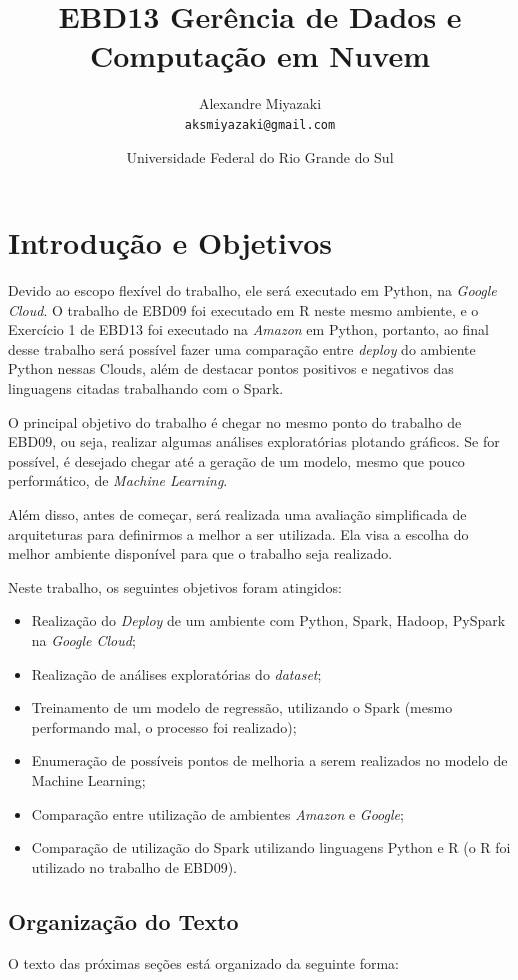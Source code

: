 \documentclass{article}
\title{EBD13 Gerência de Dados e Computação em Nuvem} %
\author{Alexandre Miyazaki\\ \texttt{aksmiyazaki@gmail.com}} %
\date{Universidade Federal do Rio Grande do Sul} %
\begin{document}
\maketitle %

\section{Introdução e Objetivos}
Devido ao escopo flexível do trabalho, ele será executado em Python, na \emph{Google Cloud}. O trabalho de EBD09 foi executado em R neste mesmo ambiente, e o Exercício 1 de EBD13 foi executado na \emph{Amazon} em Python, portanto, ao final desse trabalho será possível fazer uma comparação entre \emph{deploy} do ambiente Python nessas Clouds, além de destacar pontos positivos e negativos das linguagens citadas trabalhando com o Spark.

O principal objetivo do trabalho é chegar no mesmo ponto do trabalho de EBD09, ou seja, realizar algumas análises exploratórias plotando gráficos. Se for possível, é desejado chegar até a geração de um modelo, mesmo que pouco performático, de \emph{Machine Learning}.

Além disso, antes de começar, será realizada uma avaliação simplificada de arquiteturas para definirmos a melhor a ser utilizada. Ela visa a escolha do melhor ambiente disponível para que o trabalho seja realizado.

Neste trabalho, os seguintes objetivos foram atingidos:

\begin{itemize}
    \item Realização do \emph{Deploy} de um ambiente com Python, Spark, Hadoop, PySpark na \emph{Google Cloud};
    \item Realização de análises exploratórias do \emph{dataset};
    \item Treinamento de um modelo de regressão, utilizando o Spark (mesmo performando mal, o processo foi realizado);
    \item Enumeração de possíveis pontos de melhoria a serem realizados no modelo de Machine Learning;
    \item Comparação entre utilização de ambientes \emph{Amazon} e \emph{Google};
    \item Comparação de utilização do Spark utilizando linguagens Python e R (o R foi utilizado no trabalho de EBD09).
\end{itemize}

\subsection{Organização do Texto}
O texto das próximas seções está organizado da seguinte forma:
\end{document}
